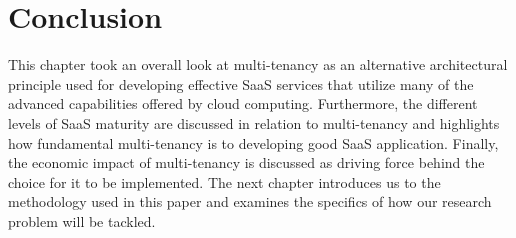 \section{Conclusion}

This chapter took an overall look at multi-tenancy as an alternative architectural principle used for developing effective SaaS services that utilize many of the advanced capabilities offered by cloud computing. Furthermore, the different levels of SaaS maturity are discussed in relation to multi-tenancy and highlights how fundamental multi-tenancy is to developing good SaaS application. Finally, the economic impact of multi-tenancy is discussed as driving force behind the choice for it to be implemented. The next chapter introduces us to the methodology used in this paper and examines the specifics of how our research problem will be tackled. 
